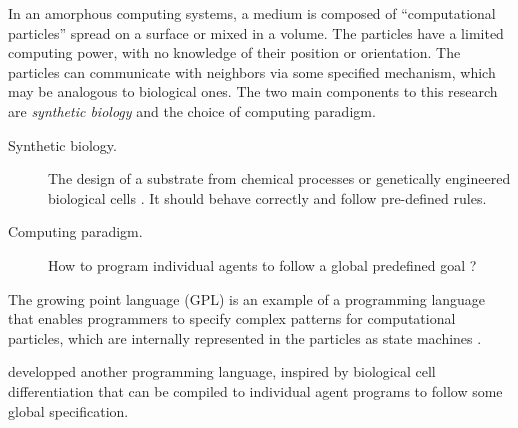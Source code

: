 In an amorphous computing systems, a medium is composed of ``computational
particles'' spread on a surface or mixed in a volume. The particles have a
limited computing power, with no knowledge of their position or orientation. The
particles can communicate with neighbors via some specified mechanism, which may
be analogous to biological ones. The two main components to this research are 
\emph{synthetic biology} and the choice of computing paradigm.
\begin{description}
  \item[Synthetic biology.] The design of a substrate from chemical processes or
        genetically engineered biological cells
        \parencite{weissVivoDigitalCircuits2002}. It should behave correctly and
        follow pre-defined rules.
  \item[Computing paradigm.] How to program individual agents to follow a
        global predefined goal
        \parencite{nagpalProgrammableSelfassemblyConstructing2001}?
\end{description}


The growing point language (GPL) is an example of a programming language that
enables programmers to specify complex patterns for computational particles,
which are internally represented in the particles as state machines
\parencite{cooreBotanicalComputingDevelopmental1999}.

\textcite{nagpalProgrammableSelfassemblyUsing2002} developped another
programming language, inspired by biological cell differentiation
\parencite{lawrenceMakingFlyGenetics1992,
  wolpertPositionalInformationSpatial1969} that can be compiled to individual agent
programs to follow some global specification.

